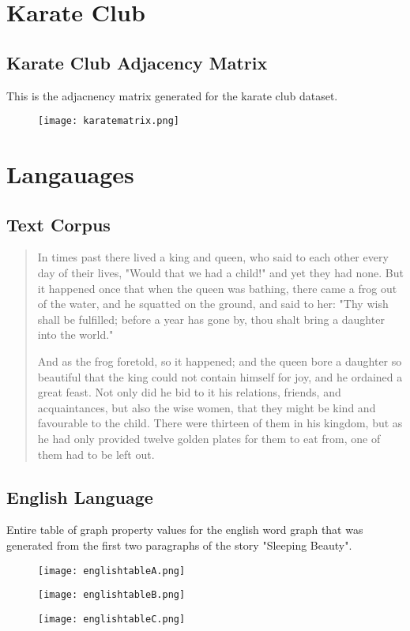 \begin{appendices}
\chapter{Karate Club}
\section{Karate Club Adjacency Matrix}\label{app:karateadj}
This is the adjacnency matrix generated for the karate club dataset.
\begin{figure}[H]
	\centering
	\texttt{[image: karatematrix.png]}
\end{figure}

\chapter{Langauages}
\section{Text Corpus}
\begin{quote}
In times past there lived a king and queen, who said to each other every day of their lives, "Would that we had a child!" and yet they had none. But it happened once that when the queen was bathing, there came a frog out of the water, and he squatted on the ground, and said to her: "Thy wish shall be fulfilled; before a year has gone by, thou shalt bring a daughter into the world."

And as the frog foretold, so it happened; and the queen bore a daughter so beautiful that the king could not contain himself for joy, and he ordained a great feast. Not only did he bid to it his relations, friends, and acquaintances, but also the wise women, that they might be kind and favourable to the child. There were thirteen of them in his kingdom, but as he had only provided twelve golden plates for them to eat from, one of them had to be left out.
\end{quote}
\section{English Language}
Entire table of graph property values for the english word graph that was generated from the first two paragraphs of the story "Sleeping Beauty".
\begin{figure}[H]
	\centering
	\texttt{[image: englishtableA.png]}
\end{figure}
\begin{figure}[H]
	\centering
	\texttt{[image: englishtableB.png]}
\end{figure}
\begin{figure}[H]
	\centering
	\texttt{[image: englishtableC.png]}
\end{figure}

\end{appendices}